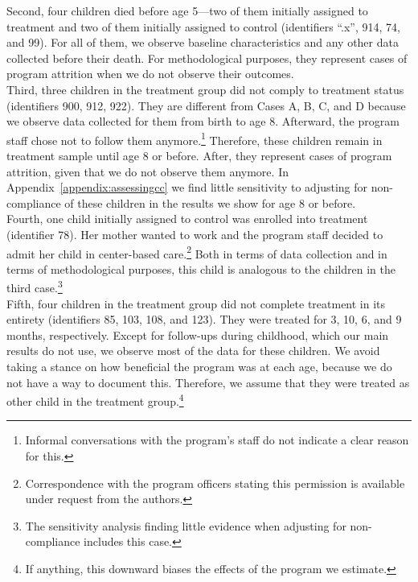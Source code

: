\noindent Second, four children died before age 5---two of them initially assigned to treatment and two of them initially assigned to control (identifiers ``.x'', 914, 74, and 99). For all of them, we observe baseline characteristics and any other data collected before their death. For methodological purposes, they represent cases of program attrition when we do not observe their outcomes.\\

\noindent Third, three children in the treatment group did not comply to treatment status (identifiers 900, 912, 922). They are different from Cases A, B, C, and D because we observe data collected for them from birth to age 8. Afterward, the program staff chose not to follow them anymore.\footnote{Informal conversations with the program's staff do not indicate a clear reason for this.} Therefore, these children remain in treatment sample until age 8 or before. After, they represent cases of program attrition, given that we do not observe them anymore. In Appendix~\ref{appendix:assessingcc} we find little sensitivity to adjusting for non-compliance of these children in the results we show for age 8 or before.\\



\noindent Fourth, one child initially assigned to control was enrolled into treatment (identifier 78). Her mother wanted to work and the program staff decided to admit her child in center-based care.\footnote{Correspondence with the program officers stating this permission is available under request from the authors.} Both in terms of data collection and in terms of methodological purposes, this child is analogous to the children in the third case.\footnote{The sensitivity analysis finding little evidence when adjusting for non-compliance includes this case.}\\

\noindent Fifth, four children in the treatment group did not complete treatment in its entirety (identifiers 85, 103, 108, and 123). They were treated for 3, 10, 6, and 9 months, respectively. Except for follow-ups during childhood, which our main results do not use, we observe most of the data for these children. We avoid taking a stance on how beneficial the program was at each age, because we do not have a way to document this. Therefore, we assume that they were treated as other child in the treatment group.\footnote{If anything, this downward biases the effects of the program we estimate.} \\

